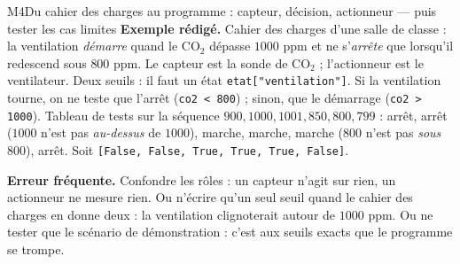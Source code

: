 \begin{fichemethode}{M4}{Du cahier des charges au programme : capteur, décision, actionneur --- puis tester les cas limites}
\textbf{Exemple rédigé.} Cahier des charges d'une salle de classe : la ventilation
\emph{démarre} quand le CO$_2$ dépasse $1000$ ppm et ne s'\emph{arrête} que lorsqu'il
redescend sous $800$ ppm. Le capteur est la sonde de CO$_2$ ; l'actionneur est le
ventilateur. Deux seuils : il faut un état \lstinline{etat["ventilation"]}. Si la
ventilation tourne, on ne teste que l'arrêt (\lstinline{co2 < 800}) ; sinon, que le
démarrage (\lstinline{co2 > 1000}). Tableau de tests sur la séquence
$900, 1000, 1001, 850, 800, 799$ : arrêt, arrêt ($1000$ n'est pas \emph{au-dessus} de
$1000$), marche, marche, marche ($800$ n'est pas \emph{sous} $800$), arrêt. Soit
\lstinline{[False, False, True, True, True, False]}.

\textbf{Erreur fréquente.} Confondre les rôles : un capteur n'agit sur rien, un actionneur ne
mesure rien. Ou n'écrire qu'un seul seuil quand le cahier des charges en donne deux : la
ventilation clignoterait autour de $1000$ ppm. Ou ne tester que le scénario de
démonstration : c'est aux seuils exacts que le programme se trompe.

\end{fichemethode}
